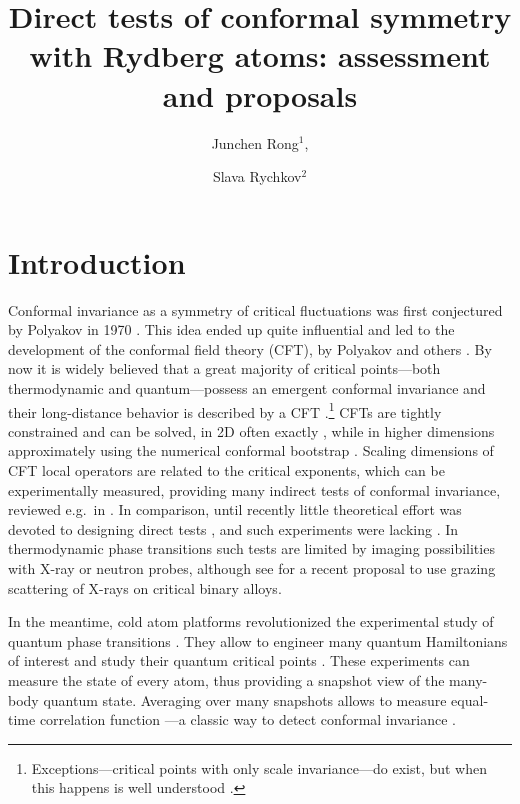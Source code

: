 \documentclass[a4paper,11pt]{article}
\title{Direct tests of conformal symmetry with Rydberg atoms: assessment and proposals}
\author{Junchen Rong$^1$,}
\author{Slava Rychkov$^2$}
\affiliation{$^1$CPHT, CNRS, \'Ecole Polytechnique, Institut Polytechnique de Paris, Palaiseau, France\\
$^2$Institut des Hautes \'Etudes Scientifiques, 91440 Bures-sur-Yvette, France}
\theoremstyle{remark}
\theoremstyle{theorem}
\begin{document}
 
	
	\maketitle
	
	\flushbottom


\flushbottom


\section{Introduction}

Conformal invariance as a symmetry of critical fluctuations was first conjectured by Polyakov in 1970 \cite{Polyakov:1970xd}. This idea ended up quite influential and led to the development of the conformal field theory (CFT), by Polyakov and others \cite{Polyakov:1974gs,Belavin:1984vu}. By now it is widely believed that a great majority of critical points---both thermodynamic and quantum---possess an emergent conformal invariance and their long-distance behavior is described by a CFT \cite{Cardy1987,Cardy:1996xt,tsvelik,fradkin}.\footnote{Exceptions---critical points with only scale invariance---do exist, but when this happens is well understood \cite{Polchinski:1987dy,Nakayama:2013is}.} CFTs are tightly constrained and can be solved, in 2D often exactly \cite{DiFrancesco:1997nk}, while in higher dimensions approximately using the numerical conformal bootstrap \cite{Poland:2018epd}. Scaling dimensions of CFT local operators are related to the critical exponents, which can be experimentally measured, providing many indirect tests of conformal invariance, reviewed e.g.~in \cite{Henkel1999,Rychkov:2025zks}. In comparison, until recently little theoretical effort was devoted to designing direct tests \cite{Pokrovskii1973,Gompper1985}, and such experiments were lacking \cite{Rychkov:2025zks}. In thermodynamic phase transitions such tests are limited by imaging possibilities with X-ray or neutron probes, although see \cite{Podo:2026hfh} for a recent proposal to use grazing scattering of X-rays on critical binary alloys.

In the meantime, cold atom platforms revolutionized the experimental study of quantum phase transitions \cite{}. They allow to engineer many quantum Hamiltonians of interest and study their quantum critical points \cite{}. These experiments can measure the state of every atom, thus providing a snapshot view of the many-body quantum state. Averaging over many snapshots allows to measure equal-time correlation function \cite{}---a classic way to detect conformal invariance \cite{Polyakov:1970xd}.
\end{document}

